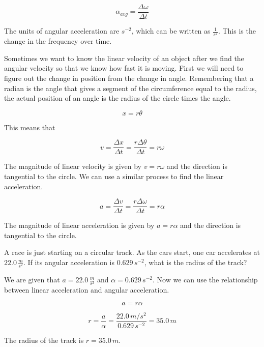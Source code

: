 \documentclass[12pt]{book}
\begin{document}
\begin{equation}
\alpha_{avg} = \frac{\Delta \omega}{\Delta t}
\end{equation}

The units of angular acceleration are $s^{-2}$, which can be written as $\frac{1}{s^2}$. This is the change in the frequency over time.

Sometimes we want to know the linear velocity of an object after we find the angular velocity so that we know how fast it is moving. First we will need to figure out the change in position from the change in angle. Remembering that a radian is the angle that gives a segment of the circumference equal to the radius, the actual position of an angle is the radius of the circle times the angle.

\begin{equation}
x = r \theta
\end{equation}

This means that 

\begin{equation}
v = \frac{\Delta x}{\Delta t} = \frac{r \Delta \theta}{\Delta t} = r \omega
\end{equation}

The magnitude of linear velocity is given by $v = r \omega$ and the direction is tangential to the circle. We can use a similar process to find the linear acceleration.

\begin{equation}
a = \frac{\Delta v}{\Delta t} = \frac{r \Delta \omega}{\Delta t} = r \alpha
\end{equation}

The magnitude of linear acceleration is given by $a = r \alpha$ and the direction is tangential to the circle.

\begin{exampleblock}

A race is just starting on a circular track. As the cars start, one car accelerates at $22.0 \, \frac{m}{s^2}$. If its angular acceleration is $0.629 \, s^{-2}$, what is the radius of the track?

\hspace{10pt}

We are given that $a = 22.0 \, \frac{m}{s^2}$ and $\alpha = 0.629 \, s^{-2}$. Now we can use the relationship between linear acceleration and angular acceleration.

\begin{equation}
a = r \alpha
\end{equation}

\begin{equation}
r = \frac{a}{\alpha} = \frac{22.0 \, m/s^2}{0.629 \, s^{-2}} = 35.0 \, m
\end{equation}

The radius of the track is $r = 35.0 \, m$.

\end{exampleblock}
\end{document}
